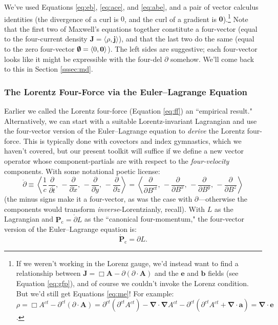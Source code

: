 \documentclass[12pt]{article}
\renewcommand{\vv}[1]{\mathbf{#1}}
\newcommand{\del}{\boldsymbol{\nabla}}
\begin{document}
We've used Equations \ref{eq:eb}, \ref{eq:ace}, and \ref{eq:abe}, and a pair of vector calculus identities (the divergence of a curl is $0$, and the curl of a gradient is $\vv 0$).\footnote{If we weren't working in the Lorenz gauge, we'd instead want to find a relationship between $\vv J = \Box \vv A - \partialup (\partialup \cdot \vv A)$ and the $\vv e$ and $\vv b$ fields (see Equation \ref{eq:gfp}), and of course we couldn't invoke the Lorenz condition. But we'd still get Equations \ref{eq:me}! For example: $\rho = \Box A^{ct} - \partial^{ct}(\partialup \cdot \vv A) = \partial^{ct} (\partial^{ct} A^{ct}) - \del \cdot \del A^{ct} - \partial^{ct} (\partial^{ct} A^{ct} + \del \cdot \vv a) = \del \cdot \vv e$.} Note that the first two of Maxwell's equations together constitute a four-vector (equal to the four-current density $\vv J = \langle \rho, \vv j \rangle$), and that the last two do the same (equal to the zero four-vector $\textrm{\mbox{\boldmath $\emptyset$}} = \langle 0, \vv 0 \rangle$). The left sides are suggestive; each four-vector looks like it might be expressible with the four-del $\partialup$ somehow. We'll come back to this in Section \ref{sssec:md}.


\subsubsection{The Lorentz Four-Force via the Euler--Lagrange Equation}\label{sssec:ele}

Earlier we called the Lorentz four-force (Equation \ref{eq:ff}) an ``empirical result." Alternatively, we can start with a suitable Lorentz-invariant Lagrangian and use the four-vector version of the Euler--Lagrange equation to \emph{derive} the Lorentz four-force. This is typically done with covectors and index gymnastics, which we haven't covered, but our present toolkit will suffice if we define a new vector operator whose component-partials are with respect to the \emph{four-velocity} components. With some notational poetic license:
\begin{equation*}
\mathring{\partialup} \equiv \left \langle \dfrac{1}{c} \, \dfrac{\partial}{\partial \mathring{t}} , \,  - \dfrac{\partial}{\partial \mathring{x}} , \, - \dfrac{\partial}{\partial \mathring{y}} , \, - \dfrac{\partial}{\partial \mathring{z}} \right \rangle = \left \langle \dfrac{\partial}{\partial B^{ct}} , \,  - \dfrac{\partial}{\partial B^x} , \, - \dfrac{\partial}{\partial B^y} , \, - \dfrac{\partial}{\partial B^z} \right \rangle
\end{equation*}
(the minus signs make it a four-vector, as was the case with $\partialup$---otherwise the components would transform \emph{inverse}-Lorentzianly, recall). With $L$ as the Lagrangian and $\vv P _\textrm{c} = \mathring{\partialup} L$ as the ``canonical four-momentum," the four-vector version of the Euler--Lagrange equation is:
\begin{equation}\label{eq:ele}
\mathring{\vv P}_\textrm{c} = \partialup L .
\end{equation}
\end{document}
